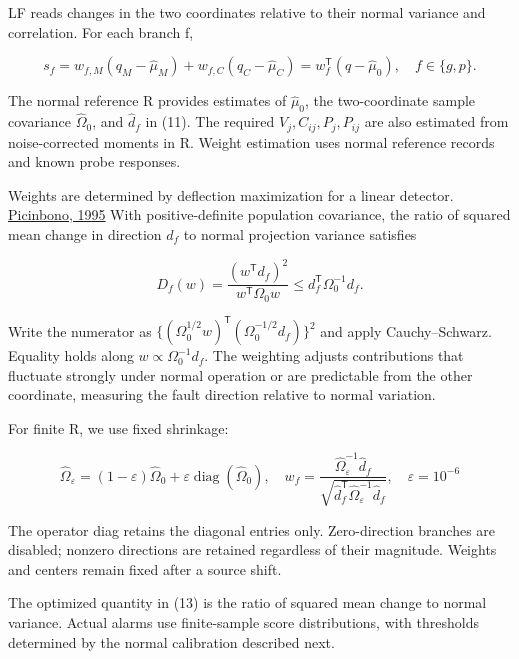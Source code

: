 \documentclass[10pt,a4paper]{article}
\begin{document}
LF reads changes in the two coordinates relative to their normal variance and correlation. For each branch f,

\begin{equation}
s_f=w_{f,M}(q_M-\widehat\mu_M)+w_{f,C}(q_C-\widehat\mu_C)
=w_f^{\mathsf T}(q-\widehat\mu_0),\quad f\in\{g,p\}.
\tag{12}
\end{equation}

The normal reference R provides estimates of \(\widehat\mu_0\), the two-coordinate sample covariance \(\widehat\Omega_0\), and \(\widehat d_f\) in (11). The required \(V_j,C_{ij},P_j,P_{ij}\) are also estimated from noise-corrected moments in R. Weight estimation uses normal reference records and known probe responses.

Weights are determined by deflection maximization for a linear detector. \href{https://doi.org/10.1109/7.395235}{Picinbono, 1995} With positive-definite population covariance, the ratio of squared mean change in direction \(d_f\) to normal projection variance satisfies

\begin{equation}
D_f(w)=\frac{(w^{\mathsf T}d_f)^2}{w^{\mathsf T}\Omega_0w}
\leq d_f^{\mathsf T}\Omega_0^{-1}d_f.
\tag{13}
\end{equation}

Write the numerator as \(\{(\Omega_0^{1/2}w)^{\mathsf T}(\Omega_0^{-1/2}d_f)\}^2\) and apply Cauchy–Schwarz. Equality holds along \(w\propto\Omega_0^{-1}d_f\). The weighting adjusts contributions that fluctuate strongly under normal operation or are predictable from the other coordinate, measuring the fault direction relative to normal variation.

For finite R, we use fixed shrinkage:

\begin{equation}
\widehat\Omega_\varepsilon
=(1-\varepsilon)\widehat\Omega_0+
\varepsilon\operatorname{diag}(\widehat\Omega_0),\quad
w_f=\frac{\widehat\Omega_\varepsilon^{-1}\widehat d_f}
{\sqrt{\widehat d_f^{\mathsf T}\widehat\Omega_\varepsilon^{-1}\widehat d_f}},
\quad\varepsilon=10^{-6}
\tag{14}
\end{equation}

The operator diag retains the diagonal entries only. Zero-direction branches are disabled; nonzero directions are retained regardless of their magnitude. Weights and centers remain fixed after a source shift.

The optimized quantity in (13) is the ratio of squared mean change to normal variance. Actual alarms use finite-sample score distributions, with thresholds determined by the normal calibration described next.
\end{document}
